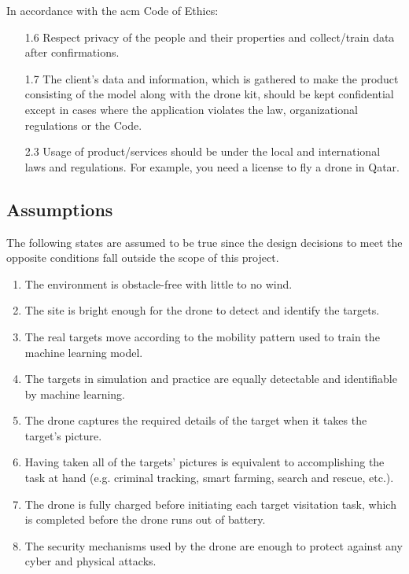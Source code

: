 \documentclass[../main.tex]{subfiles}
\begin{document}
\noindent
In accordance with the \gls{acm} Code of Ethics:
\begin{itemize}
    \item[1.6] Respect privacy of the people and their 
        properties and collect/train data after confirmations.
    \item[1.7] The client's data and information, which is gathered 
        to make the product consisting of the model along with 
        the drone kit, should be kept confidential except in cases 
        where the application violates the law, 
        organizational regulations or the Code.
    \item[2.3] Usage of product/services should be under 
        the local and international laws and regulations. 
        For example, you need a license to fly a drone in Qatar.
\end{itemize}

\subsection{Assumptions}

The following states are assumed to be true
since the design decisions to meet the opposite
conditions fall outside the scope of this project.

\begin{enumerate}
    \item The environment is obstacle-free with little 
        to no wind.
    \item The site is bright enough for the drone to
        detect and identify the targets.
    \item The real targets move according to the mobility 
        pattern used to train the machine learning model.
    \item The targets in simulation and practice are 
        equally detectable and identifiable by
        machine learning.
    \item The \anafi drone captures the 
        required details of the target 
        when it takes the target’s picture.
    \item Having taken all of the targets' pictures 
        is equivalent to accomplishing the task at hand 
        (e.g. criminal tracking, smart farming, 
        search and rescue, etc.).
    \item The \anafi drone is fully charged before 
        initiating each target visitation task,
        which is completed before the drone
        runs out of battery.
    \item The security mechanisms used by the \anafi
        drone are enough to protect against
        any cyber and physical attacks.
\end{enumerate}
\end{document}
